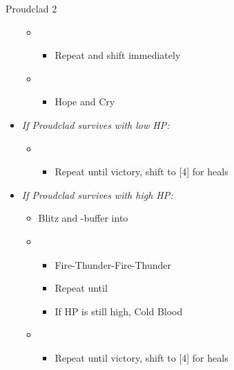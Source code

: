 \begin{battle}[2:03]{Proudclad 2}
\begin{itemize}
			      \begin{itemize}
				      \item \first
				            \begin{itemize}
					            \item Repeat and shift immediately
				            \end{itemize}
				      \item \second
				            \begin{itemize}
					            \item Hope and Cry
				            \end{itemize}
			      \end{itemize}
 					\item \textit{If Proudclad survives with low HP:}
					\begin{itemize}
						\item \second
							\begin{itemize}
								\item Repeat until victory, shift to [4] for heals
							\end{itemize}
							\end{itemize}
				     \item \textit{If Proudclad survives with high HP:}
					\begin{itemize}
						\item Blitz and \rav-buffer into
						\item \sixth
							\begin{itemize}
								\item Fire-Thunder-Fire-Thunder
								\item Repeat until \stagger
								\item If HP is still high, Cold Blood
							\end{itemize}
						\item \second
							\begin{itemize}
								\item Repeat until victory, shift to [4] for heals
							\end{itemize}
			      \end{itemize}
		\end{itemize}
\end{battle}
\vfill
\ 